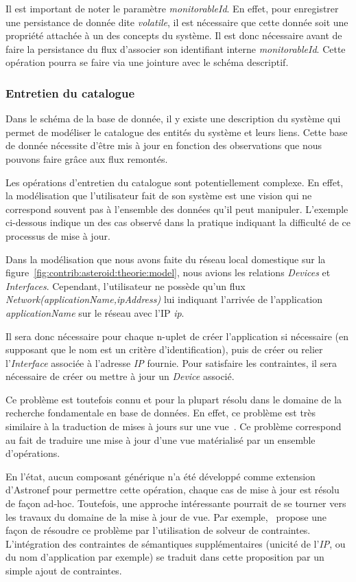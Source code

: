 Il est important de noter le paramètre \textit{monitorableId}. En effet, pour enregistrer une persistance de donnée dite \textit{volatile}, il est nécessaire que cette donnée soit une propriété attachée à un des concepts du système. Il est donc nécessaire avant de faire la persistance du flux d'associer son identifiant interne \textit{monitorableId}. Cette opération pourra se faire via une jointure avec le schéma descriptif.

\subsubsection{Entretien du catalogue}
Dans le schéma de la base de donnée, il y existe une description du système qui permet de modéliser le catalogue des entités du système et leurs liens. Cette base de donnée nécessite d'être mis à jour en fonction des observations que nous pouvons faire grâce aux flux remontés.

Les opérations d'entretien du catalogue sont potentiellement complexe. En effet, la modélisation que l'utilisateur fait de son système est une vision qui ne correspond souvent pas à l'ensemble des données qu'il peut manipuler. L'exemple ci-dessous indique un des cas observé dans la pratique indiquant la difficulté de ce processus de mise à jour.

\begin{example}
Dans la modélisation que nous avons faite du réseau local domestique sur la figure~\ref{fig:contrib:asteroid:theorie:model}, nous avions les relations \textit{Devices} et \textit{Interfaces}. Cependant, l'utilisateur ne possède qu'un flux \textit{Network(applicationName,ipAddress)} lui indiquant l'arrivée de l'application \textit{applicationName} sur le réseau avec l'IP \textit{ip}.

Il sera donc nécessaire pour chaque n-uplet de créer l'application si nécessaire (en supposant que le nom est un critère d'identification), puis de créer ou relier l'\textit{Interface} associée à l'adresse \textit{IP} fournie. Pour satisfaire les contraintes, il sera nécessaire de créer ou mettre à jour un \textit{Device} associé.
\end{example}

Ce problème est toutefois connu et pour la plupart résolu dans le domaine de la recherche fondamentale en base de données. En effet, ce problème est très similaire à  la traduction de mises à jours sur une vue~\cite{Keller:viewupdate}. Ce problème correspond au fait de traduire une mise à jour d'une vue matérialisé par un ensemble d'opérations.

En l'état, aucun composant générique n'a été développé comme extension d'Astronef pour permettre cette opération, chaque cas de mise à jour est résolu de façon ad-hoc. Toutefois, une approche intéressante pourrait de se tourner vers les travaux du domaine de la mise à jour de vue. Par exemple,~\cite{Shu:viewupdate} propose une façon de résoudre ce problème par l'utilisation de solveur de contraintes. L'intégration des contraintes de sémantiques supplémentaires (unicité de l'\textit{IP}, ou du nom d'application par exemple) se traduit dans cette proposition par un simple ajout de contraintes.
